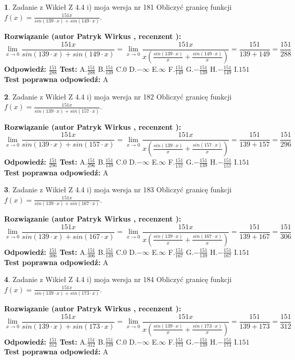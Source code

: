 \documentclass[12pt, a4paper]{article}
\theoremstyle{definition} %
\newtheorem{zad}{}
\newcommand{\zadStart}[1]{\begin{zad}#1\newline}
\newcommand{\zadStop}{\end{zad}}
\newcommand{\rozwStart}[2]{\noindent \textbf{Rozwiązanie (autor #1 , recenzent #2): }\newline}
\newcommand{\rozwStop}{\newline}
\newcommand{\odpStart}{\noindent \textbf{Odpowiedź:}\newline}
\newcommand{\odpStop}{\newline}
\newcommand{\testStart}{\noindent \textbf{Test:}\newline}
\newcommand{\testStop}{\newline}
\newcommand{\kluczStart}{\noindent \textbf{Test poprawna odpowiedź:}\newline}
\newcommand{\kluczStop}{\newline}
\begin{document}
\zadStart{Zadanie z Wikieł Z 4.4 i) moja wersja nr 181}
Obliczyć granicę funkcji $f(x)=\frac{151x}{sin(139\cdot x) +sin(149\cdot x)}$.
\zadStop
\rozwStart{Patryk Wirkus}{}
$$\lim\limits_{x\to 0}\frac{151x}{sin(139\cdot x) +sin(149\cdot x)}=\lim\limits_{x\to 0}\frac{151x}{x(\frac{sin(139\cdot x)}{x}+\frac{sin(149\cdot x)}{x})}=\frac{151}{139+149} = \frac{151}{288}$$
\rozwStop
\odpStart
$\frac{151}{288}$
\odpStop
\testStart
A.$\frac{151}{288}$
B.$\frac{151}{139}$
C.$0$
D.$-\infty$
E.$\infty$
F.$\frac{151}{149}$
G.$-\frac{151}{139}$
H.$-\frac{151}{149}$
I.$151$
\testStop
\kluczStart
A
\kluczStop



\zadStart{Zadanie z Wikieł Z 4.4 i) moja wersja nr 182}
Obliczyć granicę funkcji $f(x)=\frac{151x}{sin(139\cdot x) +sin(157\cdot x)}$.
\zadStop
\rozwStart{Patryk Wirkus}{}
$$\lim\limits_{x\to 0}\frac{151x}{sin(139\cdot x) +sin(157\cdot x)}=\lim\limits_{x\to 0}\frac{151x}{x(\frac{sin(139\cdot x)}{x}+\frac{sin(157\cdot x)}{x})}=\frac{151}{139+157} = \frac{151}{296}$$
\rozwStop
\odpStart
$\frac{151}{296}$
\odpStop
\testStart
A.$\frac{151}{296}$
B.$\frac{151}{139}$
C.$0$
D.$-\infty$
E.$\infty$
F.$\frac{151}{157}$
G.$-\frac{151}{139}$
H.$-\frac{151}{157}$
I.$151$
\testStop
\kluczStart
A
\kluczStop



\zadStart{Zadanie z Wikieł Z 4.4 i) moja wersja nr 183}
Obliczyć granicę funkcji $f(x)=\frac{151x}{sin(139\cdot x) +sin(167\cdot x)}$.
\zadStop
\rozwStart{Patryk Wirkus}{}
$$\lim\limits_{x\to 0}\frac{151x}{sin(139\cdot x) +sin(167\cdot x)}=\lim\limits_{x\to 0}\frac{151x}{x(\frac{sin(139\cdot x)}{x}+\frac{sin(167\cdot x)}{x})}=\frac{151}{139+167} = \frac{151}{306}$$
\rozwStop
\odpStart
$\frac{151}{306}$
\odpStop
\testStart
A.$\frac{151}{306}$
B.$\frac{151}{139}$
C.$0$
D.$-\infty$
E.$\infty$
F.$\frac{151}{167}$
G.$-\frac{151}{139}$
H.$-\frac{151}{167}$
I.$151$
\testStop
\kluczStart
A
\kluczStop



\zadStart{Zadanie z Wikieł Z 4.4 i) moja wersja nr 184}
Obliczyć granicę funkcji $f(x)=\frac{151x}{sin(139\cdot x) +sin(173\cdot x)}$.
\zadStop
\rozwStart{Patryk Wirkus}{}
$$\lim\limits_{x\to 0}\frac{151x}{sin(139\cdot x) +sin(173\cdot x)}=\lim\limits_{x\to 0}\frac{151x}{x(\frac{sin(139\cdot x)}{x}+\frac{sin(173\cdot x)}{x})}=\frac{151}{139+173} = \frac{151}{312}$$
\rozwStop
\odpStart
$\frac{151}{312}$
\odpStop
\testStart
A.$\frac{151}{312}$
B.$\frac{151}{139}$
C.$0$
D.$-\infty$
E.$\infty$
F.$\frac{151}{173}$
G.$-\frac{151}{139}$
H.$-\frac{151}{173}$
I.$151$
\testStop
\kluczStart
A
\kluczStop
\end{document}
